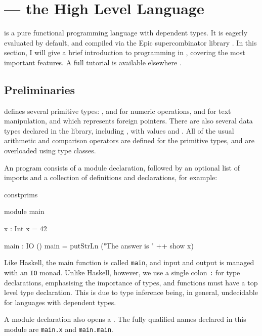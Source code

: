 \section{\Idris{} --- the High Level Language}

\label{sect:hll}

\Idris{} is
a pure functional programming language with dependent types. It is
eagerly evaluated by default, and compiled via the Epic supercombinator
library \cite{brady2011epic}.
In this section, I will give a brief introduction to programming in \Idris{},
covering the most important features. A full tutorial is available elsewhere
\cite{idristutorial}. 

\subsection{Preliminaries}

\Idris{} defines several primitive types: ,  and
 for numeric operations,  and  for
text manipulation, and  which represents foreign pointers.
There are also several data types declared in the library, including
, with values  and . All of the usual
arithmetic and comparison operators are defined for the primitive types,
and are overloaded using type classes.

An \Idris{} program consists of a module declaration, followed by an optional
list of imports and a collection of definitions and declarations, for example:

\begin{SaveVerbatim}{constprims}

module main

x : Int
x = 42

main : IO ()
main = putStrLn ("The answer is " ++ show x)

\end{SaveVerbatim}

\noindent
Like Haskell, the main function
is called \texttt{main}, and input and output is managed with an \texttt{IO}
monad. Unlike Haskell, however, we use a single colon \texttt{:} for type
declarations, emphasising the importance of types, 
and  functions must have a top level type
declaration. This is due to type inference being, in general, 
undecidable for languages with
dependent types.

A module declaration also opens a . The fully qualified names
declared in this module are \texttt{main.x} and \texttt{main.main}.


